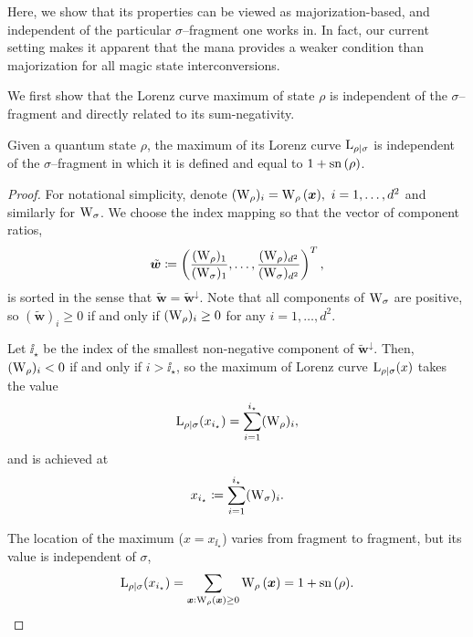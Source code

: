 \documentclass[pra,
aps,
twocolumn,
superscriptaddress,
groupedaddress,
nofootinbib,
reprint
]{revtex4-1}
\begin{document}
Here, we show that its properties can be viewed as majorization-based, and independent of the particular $\sigma$--fragment one works in.
In fact, our current setting makes it apparent that the mana provides a weaker condition than majorization for all magic state interconversions.

We first show that the Lorenz curve maximum of state $\rho$ is independent of the $\sigma$--fragment and directly related to its sum-negativity.
\begin{lemma}\label{lem:lcmax}
	Given a quantum state $\rho$, the maximum of its Lorenz curve ${{\rm{L}}_{\rho|\sigma}}$ is independent of the $\sigma$--fragment in which it is defined and equal to $1+{{\rm{sn}}\left(\rho\right)}$.
\end{lemma}
\begin{proof}
	For notational simplicity, denote $(\W{\rho})_i = \W[\bmx]{\rho},\ i = 1,\dots, d^2$ and similarly for $\W{\sigma}$.
	We choose the index mapping so that the vector of component ratios, 
	\begin{equation}
		\tilde{\bm{w}} \coloneqq \left(\frac{(\W{\rho})_1}{(\W{\sigma})_1}, \dots, \frac{(\W{\rho})_{d^2}}{(\W{\sigma})_{d^2}} \right)^T,
	\end{equation}
	is sorted in the sense that $\tilde{\bm{w}} = \tilde{\bm{w}}^\downarrow$.
	Note that all components of $\W{\sigma}$ are positive, so $(\tilde{\bm{w}})_i \geq 0$ if and only if $(\W{\rho})_i \geq 0$ for any $i=1,\dots,d^2$.
	
	Let $\ii_\star$ be the index of the smallest non-negative component of $\tilde{\bm{w}}^\downarrow$.
	Then, $(\W{\rho})_i < 0$ if and only if $i > \ii_\star$, so the maximum of Lorenz curve ${{\rm{L}}_{\rho|\sigma}}(x)$ takes the value 
	\begin{equation}
		\lc{\rho}{\sigma}(x_{\ii_\star}) = \sum_{i=1}^{\ii_\star} (\W{\rho})_i,
	\end{equation}
	and is achieved at
	\begin{equation}\label{eq:maxloc}
		x_{\ii_\star} \coloneqq \sum_{i=1}^{\ii_\star} (\W{\sigma})_i.
	\end{equation}

	The location of the maximum ($x=x_{\ii_\star}$) varies from fragment to fragment, but its value is independent of $\sigma$,
	\begin{equation}
		\lc{\rho}{\sigma}(x_{\ii_\star})
		= \sum\limits_{\bmx: \W[\bmx]{\rho} \geq 0} \W[\bmx]{\rho}
		= 1 + \sn{\rho}.
	\end{equation}
	
\end{proof}
\end{document}
